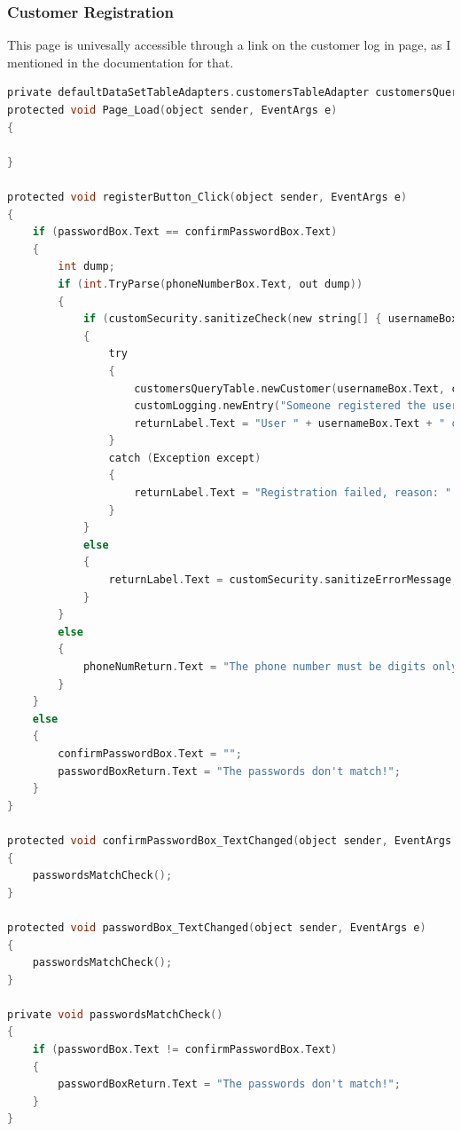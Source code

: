 ﻿\documentclass{article}
\begin{document}
    \subsubsection{Customer Registration}
    This page is univesally accessible through a link on the customer log in page, as I mentioned in the documentation for that.
    \begin{lstlisting}[language=C]
private defaultDataSetTableAdapters.customersTableAdapter customersQueryTable = new defaultDataSetTableAdapters.customersTableAdapter();
protected void Page_Load(object sender, EventArgs e)
{

}

protected void registerButton_Click(object sender, EventArgs e)
{
    if (passwordBox.Text == confirmPasswordBox.Text)
    {
        int dump;
        if (int.TryParse(phoneNumberBox.Text, out dump))
        {
            if (customSecurity.sanitizeCheck(new string[] { usernameBox.Text, passwordBox.Text, address1Box.Text, address2Box.Text, cityBox.Text, countryDropdown.SelectedValue, postcodeBox.Text, phoneNumberBox.Text, forenameBox.Text, surnameBox.Text }))
            {
                try
                {
                    customersQueryTable.newCustomer(usernameBox.Text, customSecurity.generateMD5(passwordBox.Text), address1Box.Text, address2Box.Text, cityBox.Text, countryDropdown.SelectedValue, postcodeBox.Text, phoneNumberBox.Text, forenameBox.Text, surnameBox.Text);
                    customLogging.newEntry("Someone registered the user " + usernameBox.Text);
                    returnLabel.Text = "User " + usernameBox.Text + " created";
                }
                catch (Exception except)
                {
                    returnLabel.Text = "Registration failed, reason: " + except.Message;
                }
            }
            else
            {
                returnLabel.Text = customSecurity.sanitizeErrorMessage;
            }
        }
        else
        {
            phoneNumReturn.Text = "The phone number must be digits only!";
        }
    }
    else
    {
        confirmPasswordBox.Text = "";
        passwordBoxReturn.Text = "The passwords don't match!";
    }
}

protected void confirmPasswordBox_TextChanged(object sender, EventArgs e)
{
    passwordsMatchCheck();
}

protected void passwordBox_TextChanged(object sender, EventArgs e)
{
    passwordsMatchCheck();
}

private void passwordsMatchCheck()
{
    if (passwordBox.Text != confirmPasswordBox.Text)
    {
        passwordBoxReturn.Text = "The passwords don't match!";
    }
}
    \end{lstlisting}
\end{document}
